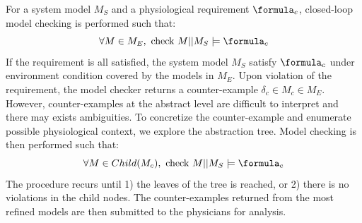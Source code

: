 For a system model $M_S$ and a physiological requirement $\formula_c$, closed-loop model checking is performed such that:
$$\forall M\in M_E, \text{ check } M||M_S\models\formula_c$$
If the requirement is all satisfied, the system model $M_S$ satisfy $\formula_c$ under environment condition covered by the models in $M_E$. Upon violation of the requirement, the model checker returns a counter-example $\delta_c\in M_c\in M_E$. However, counter-examples at the abstract level are difficult to interpret and there may exists ambiguities. To concretize the counter-example and enumerate possible physiological context, we explore the abstraction tree. Model checking is then performed such that:
$$\forall M\in Child(M_c), \text{ check } M||M_S\models\formula_c$$  
The procedure recurs until 1) the leaves of the tree is reached, or 2) there is no violations in the child nodes. The counter-examples returned from the most refined models are then submitted to the physicians for analysis. 




